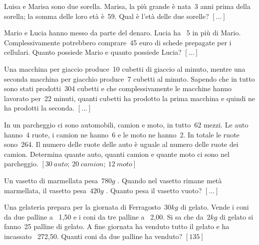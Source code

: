\begin{multicols}{2}
\begin{esercizio}
 \label{ese:22.97}
Luisa e Marisa sono due sorella. Marisa, la più grande è nata~3 anni
prima della sorella; la somma delle loro età è~59. Qual è
l'età delle due sorelle?
\hfill \(\left[...\right]\)
\end{esercizio}

\begin{esercizio}
 \label{ese:22.98}
Mario e Lucia hanno messo da parte del denaro. Lucia ha {\officialeuro}~5
in più di Mario. Complessivamente potrebbero comprare~45 euro di
schede prepagate per i cellulari. Quanto possiede Mario e quanto
possiede Lucia?
\hfill \(\left[...\right]\)
\end{esercizio}

\begin{esercizio}
 \label{ese:22.99}
Una macchina per giaccio produce~10 cubetti di giaccio al minuto, mentre
una seconda macchina per giacchio produce~7 cubetti al minuto. Sapendo
che in tutto sono stati prodotti~304 cubetti e che complessivamente le
macchine hanno lavorato per~22 minuti, quanti cubetti ha prodotto la
prima macchina e quindi ne ha prodotti la seconda.
\hfill \(\left[...\right]\)
\end{esercizio}

\begin{esercizio}[\Ast]
 \label{ese:22.100}
In un parcheggio ci sono automobili, camion e moto, in tutto~62 mezzi.
Le auto hanno~4 ruote, i camion ne hanno~6 e le moto ne hanno~2.
In totale le ruote sono~264. Il numero delle ruote delle auto è uguale
al numero delle ruote dei camion. Determina quante auto, quanti camion
e quante moto ci sono nel parcheggio.
\hfill \(\left[30~auto;~20~camion;~12~moto\right]\)
\end{esercizio}

\begin{esercizio}
 \label{ese:22.101}
 Un vasetto di marmellata pesa~\(780\unit{g}\) . Quando nel vasetto rimane
metà marmellata, il vasetto pesa~\(420\unit{g}\) . Quanto pesa il vasetto vuoto?
\hfill \(\left[...\right]\)
\end{esercizio}


\begin{esercizio}[\Ast]
 \label{ese:22.102}
Una gelateria prepara per la giornata di Ferragosto~\(30\unit{kg}\) di
gelato. Vende i coni da due palline a {\officialeuro}~1,50 e i coni da tre
palline a {\officialeuro}~2,00. Si sa che da~\(2\unit{kg}\) di gelato si fanno~25
palline di gelato. A fine giornata ha venduto tutto il gelato e ha
incassato {\officialeuro}~272,50. Quanti coni da due palline ha venduto?
\hfill \(\left[135\right]\)
\end{esercizio}


\end{multicols}
